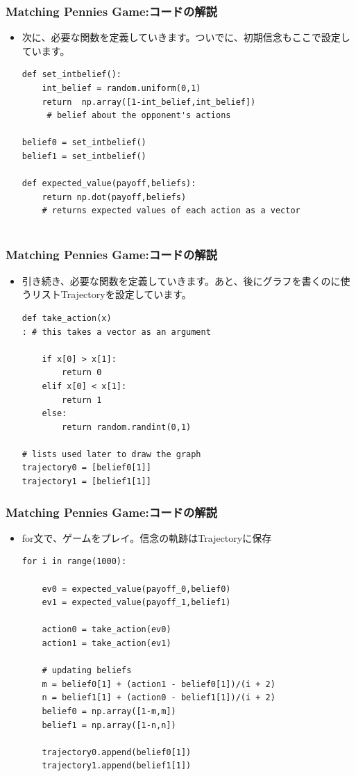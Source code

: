 \documentclass[dvipdfmx,fleqn]{beamer}
\begin{document}
\begin{frame}[containsverbatim]%
\frametitle{Matching Pennies Game:コードの解説}
\begin{itemize}\setlength{\parskip}{0.5em}
\item
次に、必要な関数を定義していきます。ついでに、初期信念もここで設定しています。
\begin{verbatim}
def set_intbelief():
	int_belief = random.uniform(0,1)
	return  np.array([1-int_belief,int_belief])
	 # belief about the opponent's actions

belief0 = set_intbelief()
belief1 = set_intbelief()

def expected_value(payoff,beliefs):
	return np.dot(payoff,beliefs)
	# returns expected values of each action as a vector


\end{verbatim}
\end{itemize}
\end{frame}


\begin{frame}[containsverbatim]%
\frametitle{Matching Pennies Game:コードの解説}
\begin{itemize}\setlength{\parskip}{0.5em}
\item
引き続き、必要な関数を定義していきます。あと、後にグラフを書くのに使うリストTrajectoryを設定しています。
\begin{verbatim}
def take_action(x)
: # this takes a vector as an argument

	if x[0] > x[1]:
		return 0
	elif x[0] < x[1]:
		return 1
	else:
		return random.randint(0,1)

# lists used later to draw the graph
trajectory0 = [belief0[1]]
trajectory1 = [belief1[1]]

\end{verbatim}
\end{itemize}
\end{frame}

\begin{frame}[containsverbatim]%
\frametitle{Matching Pennies Game:コードの解説}
\begin{itemize}\setlength{\parskip}{0.5em}
\item
for文で、ゲームをプレイ。信念の軌跡はTrajectoryに保存
\begin{verbatim}
for i in range(1000):

	ev0 = expected_value(payoff_0,belief0)
	ev1 = expected_value(payoff_1,belief1)

	action0 = take_action(ev0)
	action1 = take_action(ev1)

	# updating beliefs
	m = belief0[1] + (action1 - belief0[1])/(i + 2)
	n = belief1[1] + (action0 - belief1[1])/(i + 2)
	belief0 = np.array([1-m,m])
	belief1 = np.array([1-n,n])

	trajectory0.append(belief0[1])
	trajectory1.append(belief1[1])
\end{verbatim}
\end{itemize}
\end{frame}
\end{document}
